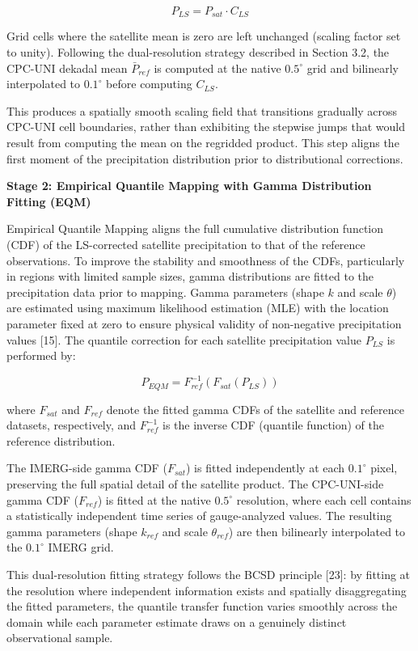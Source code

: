 \documentclass[
]{article}
\begin{document}
\[P_{LS} = P_{sat} \cdot C_{LS}\]

Grid cells where the satellite mean is zero are left unchanged (scaling
factor set to unity). Following the dual-resolution strategy described
in Section 3.2, the CPC-UNI dekadal mean \(\bar{P}_{ref}\) is computed
at the native \(0.5^{\circ}\) grid and bilinearly interpolated to
\(0.1^{\circ}\) before computing \(C_{LS}\).

This produces a spatially smooth scaling field that transitions
gradually across CPC-UNI cell boundaries, rather than exhibiting the
stepwise jumps that would result from computing the mean on the
regridded product. This step aligns the first moment of the
precipitation distribution prior to distributional corrections.

\textbf{Stage 2: Empirical Quantile Mapping with Gamma Distribution
Fitting (EQM)}

Empirical Quantile Mapping aligns the full cumulative distribution
function (CDF) of the LS-corrected satellite precipitation to that of
the reference observations. To improve the stability and smoothness of
the CDFs, particularly in regions with limited sample sizes, gamma
distributions are fitted to the precipitation data prior to mapping.
Gamma parameters (shape \(k\) and scale \(\theta\)) are estimated using
maximum likelihood estimation (MLE) with the location parameter fixed at
zero to ensure physical validity of non-negative precipitation values
{[}15{]}. The quantile correction for each satellite precipitation value
\(P_{LS}\) is performed by:

\[P_{EQM} = F_{ref}^{-1}\left( F_{sat}\left( P_{LS} \right) \right)\]

where \(F_{sat}\) and \(F_{ref}\) denote the fitted gamma CDFs of the
satellite and reference datasets, respectively, and \(F_{ref}^{-1}\) is
the inverse CDF (quantile function) of the reference distribution.

The IMERG-side gamma CDF (\(F_{sat}\)) is fitted independently at each
\(0.1^{\circ}\) pixel, preserving the full spatial detail of the
satellite product. The CPC-UNI-side gamma CDF (\(F_{ref}\)) is fitted at
the native \(0.5^{\circ}\) resolution, where each cell contains a
statistically independent time series of gauge-analyzed values. The
resulting gamma parameters (shape \(k_{ref}\) and scale
\(\theta_{ref}\)) are then bilinearly interpolated to the
\(0.1^{\circ}\) IMERG grid.

This dual-resolution fitting strategy follows the BCSD principle
{[}23{]}: by fitting at the resolution where independent information
exists and spatially disaggregating the fitted parameters, the quantile
transfer function varies smoothly across the domain while each parameter
estimate draws on a genuinely distinct observational sample.
\end{document}
